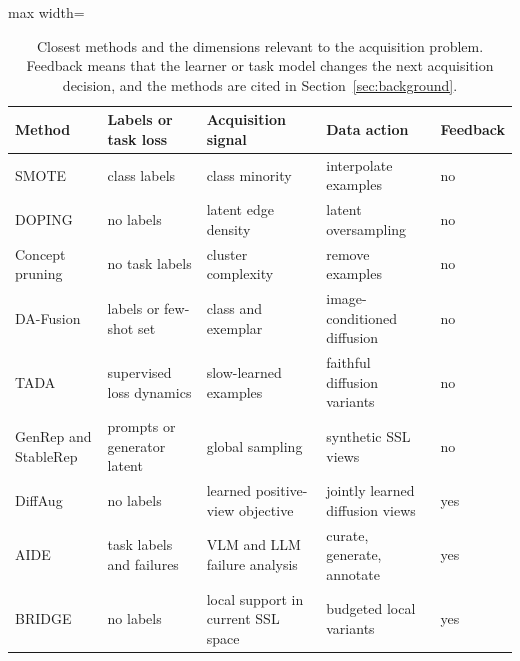 \documentclass{article}
\newcommand{\method}{BRIDGE}
\begin{document}
\begin{table}[h]
\centering
\small
\setlength{\tabcolsep}{4pt}
\caption{Closest methods and the dimensions relevant to the acquisition problem. Feedback means that the learner or task model changes the next acquisition decision, and the methods are cited in Section~\ref{sec:background}.}
\label{tab:prior-art}
\begin{adjustbox}{max width=\textwidth}
\begin{tabular}{lllll}
\toprule
Method & Labels or task loss & Acquisition signal & Data action & Feedback \\
\midrule
SMOTE & class labels & class minority & interpolate examples & no \\
DOPING & no labels & latent edge density & latent oversampling & no \\
Concept pruning & no task labels & cluster complexity & remove examples & no \\
DA-Fusion & labels or few-shot set & class and exemplar & image-conditioned diffusion & no \\
TADA & supervised loss dynamics & slow-learned examples & faithful diffusion variants & no \\
GenRep and StableRep & prompts or generator latent & global sampling & synthetic SSL views & no \\
DiffAug & no labels & learned positive-view objective & jointly learned diffusion views & yes \\
AIDE & task labels and failures & VLM and LLM failure analysis & curate, generate, annotate & yes \\
\method & no labels & local support in current SSL space & budgeted local variants & yes \\
\bottomrule
\end{tabular}
\end{adjustbox}
\end{table}
\end{document}
